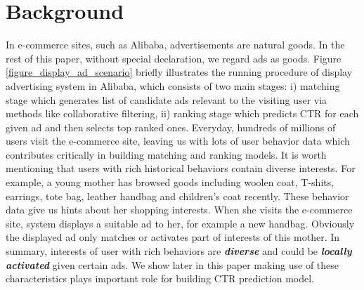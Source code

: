 \section{Background}
\label{sec:bg}

In e-commerce sites, such as Alibaba, advertisements are natural goods. In the rest of this paper, without special declaration, we regard ads as goods. Figure \ref{figure_display_ad_scenario} briefly illustrates the running procedure of display advertising system in Alibaba, which consists of two main stages: i) matching stage which generates list of candidate ads relevant to the visiting user via methods like collaborative filtering, ii) ranking stage which predicts CTR for each given ad and then selects top ranked ones.    
Everyday, hundreds of millions of users visit the e-commerce site, leaving us with lots of user behavior data which contributes critically in building matching and ranking models.
It is worth mentioning that users with rich historical behaviors contain diverse interests. 
For example, a young mother has browsed goods including woolen coat, T-shits, earrings, tote bag, leather handbag and children's coat recently. These behavior data give us hints about her shopping interests.
When she visits the e-commerce site, system displays a suitable ad to her, for example a new handbag.
Obviously the displayed ad only matches or activates part of interests of this mother. 
In summary, interests of user with rich behaviors are \textsl{\textbf{diverse}} and could be \textsl{\textbf{locally activated}} given certain ads. We show later in this paper making use of these characteristics plays important role for building CTR prediction model.


